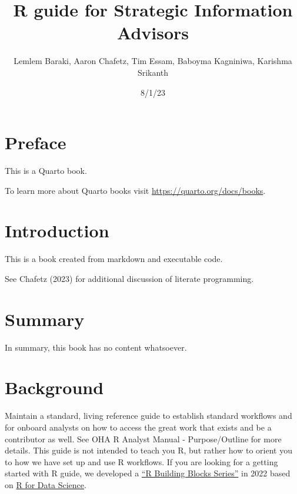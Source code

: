 \documentclass[
  letterpaper,
  DIV=11,
  numbers=noendperiod]{scrreprt}
\title{R guide for Strategic Information Advisors}
\author{Lemlem Baraki, Aaron Chafetz, Tim Essam, Baboyma Kagniniwa,
Karishma Srikanth}
\date{8/1/23}
\renewcommand*\contentsname{Table of contents}
\newcommand\contentsname{Table of contents}
\begin{document}
\maketitle
\ifdefined\Shaded\renewenvironment{Shaded}{\begin{tcolorbox}[borderline west={3pt}{0pt}{shadecolor}, interior hidden, frame hidden, sharp corners, breakable, boxrule=0pt, enhanced]}{\end{tcolorbox}}\fi

\renewcommand*\contentsname{Table of contents}
{
\hypersetup{linkcolor=}
\setcounter{tocdepth}{2}
\tableofcontents
}

\hypertarget{preface}{%
\chapter*{Preface}\label{preface}}


This is a Quarto book.

To learn more about Quarto books visit
\url{https://quarto.org/docs/books}.


\hypertarget{introduction}{%
\chapter{Introduction}\label{introduction}}

This is a book created from markdown and executable code.

See Chafetz (2023) for additional discussion of literate programming.


\hypertarget{summary}{%
\chapter{Summary}\label{summary}}

In summary, this book has no content whatsoever.


\hypertarget{background}{%
\chapter{Background}\label{background}}

Maintain a standard, living reference guide to establish standard
workflows and for onboard analysts on how to access the great work that
exists and be a contributor as well. See OHA R Analyst Manual -
Purpose/Outline for more details. This guide is not intended to teach
you R, but rather how to orient you to how we have set up and use R
workflows. If you are looking for a getting started with R guide, we
developed a
\href{https://usaid-oha-si.github.io/learn/categories/\#rbbs}{``R
Building Blocks Series''} in 2022 based on
\href{https://r4ds.had.co.nz/}{R for Data Science}.
\end{document}
